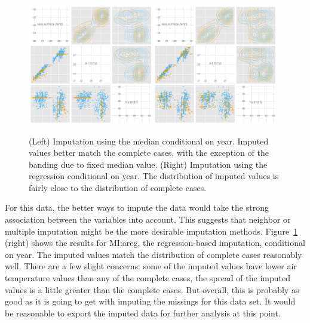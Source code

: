 \documentclass[article]{jss}
\begin{document}
\begin{figure}[htp]
\centerline{\includegraphics[width=0.49\textwidth]{graph/fig4-2-median-condition}\includegraphics[width=0.49\textwidth]{graph/fig4-4-areg-condition}}
\caption{(Left) Imputation using the median conditional on year. Imputed values better match the complete cases, with the exception of the banding due to fixed median value. (Right) Imputation using the regression conditional on year. The distribution of imputed values is fairly close to the distribution of complete cases.}
\label{fig:tao3}
\end{figure}

For this data, the better ways to impute the data would take the strong association between the variables into account. This suggests that neighbor or multiple imputation might be the more desirable imputation methods. Figure~\ref{fig:tao3} (right) shows the results for MI:areg, the regression-based imputation, conditional on year. The imputed values match the distribution of complete cases reasonably well. There are a few slight concerns: some of the imputed values have lower air temperature values than any of the complete cases, the spread of the imputed values is a little greater than the complete cases. But overall, this is probably as good as it is going to get with imputing the missings for this data set. It would be reasonable to export the imputed data for further analysis at this point.
\end{document}
